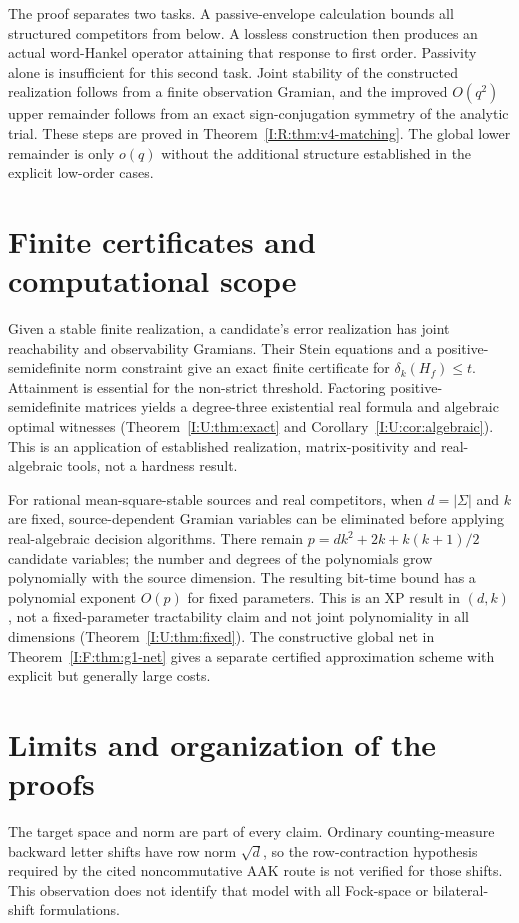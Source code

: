 The proof separates two tasks. A passive-envelope calculation bounds
all structured competitors from below. A lossless construction then
produces an actual word-Hankel operator attaining that response to first
order. Passivity alone is insufficient for this second task. Joint
stability of the constructed realization follows from a finite
observation Gramian, and the improved $O(q^2)$ upper remainder follows
from an exact sign-conjugation symmetry of the analytic trial. These
steps are proved in Theorem~\ref{I:R:thm:v4-matching}. The global lower
remainder is only $o(q)$ without the additional structure established
in the explicit low-order cases.

\section{Finite certificates and computational scope}
Given a stable finite realization, a candidate's error realization has
joint reachability and observability Gramians. Their Stein equations and
a positive-semidefinite norm constraint give an exact finite certificate
for $\delta_k(H_f)\le t$. Attainment is essential for the non-strict
threshold. Factoring positive-semidefinite matrices yields a degree-three
existential real formula and algebraic optimal witnesses
(Theorem~\ref{I:U:thm:exact} and Corollary~\ref{I:U:cor:algebraic}).
This is an application of established realization, matrix-positivity and
real-algebraic tools, not a hardness result.

For rational mean-square-stable sources and real competitors, when
$d=|\Sigma|$ and $k$ are fixed, source-dependent Gramian variables
can be eliminated before applying real-algebraic decision algorithms.
There remain
$p=dk^2+2k+k(k+1)/2$ candidate variables; the number and degrees of the
polynomials grow polynomially with the source dimension. The resulting
bit-time bound has a polynomial exponent $O(p)$ for fixed parameters.
This is an XP result in $(d,k)$, not a fixed-parameter tractability claim
and not joint polynomiality in all dimensions
(Theorem~\ref{I:U:thm:fixed}). The constructive global net in
Theorem~\ref{I:F:thm:g1-net} gives a separate certified approximation scheme
with explicit but generally large costs.

\section{Limits and organization of the proofs}
The target space and norm are part of every claim. Ordinary counting-measure
backward letter shifts have row norm $\sqrt d$, so the row-contraction
hypothesis required by the cited noncommutative AAK route is not verified
for those shifts. This observation does not identify that model with all
Fock-space or bilateral-shift formulations.

